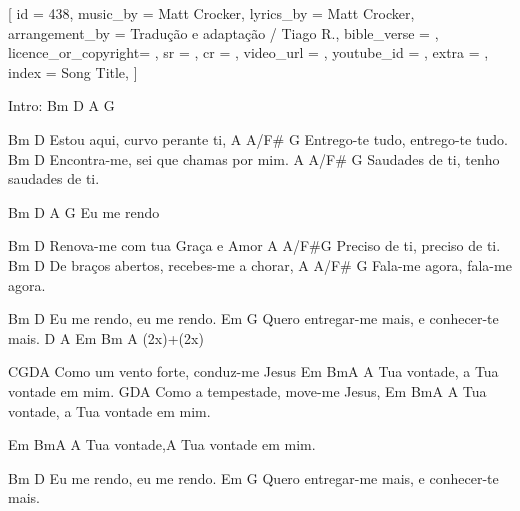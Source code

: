[
    id                  = {438},
    music_by            = {Matt Crocker}, %
    lyrics_by           = {Matt Crocker}, %
    arrangement_by      = {Tradução e adaptação / Tiago R.}, %
    bible_verse         = {},
    licence_or_copyright= {},
    sr                  = {},
    cr                  = {},
    video_url           = {}, %
    youtube_id          = {}, %
    extra               = {},
    index               = {Song Title},
]

\beginverse
Intro: Bm D A G

Bm D
Estou aqui, curvo perante ti,
A A/F# G
Entrego-te tudo, entrego-te tudo.
Bm D
Encontra-me, sei que chamas por mim.
A A/F# G
Saudades de ti, tenho saudades de ti.

Bm D A G
Eu me rendo

\endverse

\beginverse

Bm D
Renova-me com tua Graça e Amor
A A/F#G
Preciso de ti, preciso de ti.
Bm D
De braços abertos, recebes-me a chorar,
A A/F# G
Fala-me agora, fala-me agora.

\endverse

\beginverse

Bm D
Eu me rendo, eu me rendo.
Em G
Quero entregar-me mais, e conhecer-te mais.
D A Em Bm A
(2x)+(2x)

\endverse

\beginverse

CGDA
Como um vento forte, conduz-me Jesus
Em BmA
A Tua vontade, a Tua vontade em mim.
GDA
Como a tempestade, move-me Jesus,
Em BmA
A Tua vontade, a Tua vontade em mim.

Em BmA
A Tua vontade,A Tua vontade em mim.

Bm D
Eu me rendo, eu me rendo.
Em G
Quero entregar-me mais, e conhecer-te mais.

\endverse

\endsong
